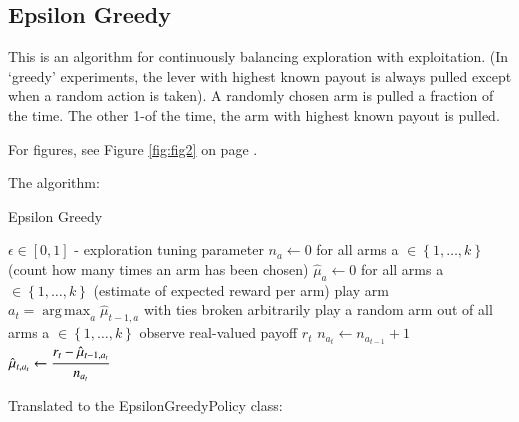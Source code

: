 \documentclass[nojss]{jss}\usepackage[]{graphicx}\usepackage[]{color}
\DeclareMathOperator*{\argmax}{arg\,max}
\begin{document}
\subsection{Epsilon Greedy}

This is an algorithm for continuously balancing exploration with exploitation. (In ‘greedy’ experiments, the lever with highest known payout is always pulled except when a random action is taken). A randomly chosen arm is pulled a fraction \epsilon of the time. The other 1-\epsilon of the time, the arm with highest known payout is pulled.

For figures, see Figure \ref{fig:fig2} on page \pageref{fig:fig2}.

The algorithm:

\begin{algorithm}
\caption{Epsilon Greedy}
\label{Alg:EpsilonGreedy}
\begin{algorithmic}
\REQUIRE \(    \epsilon  \in \left[ 0,1 \right] \) - exploration tuning parameter
\STATE \( n_{a} \leftarrow 0 \) for all arms a \(  \in \left\{ 1, \dots, k \right\} \)  (count how many times an arm has been chosen)
\STATE \( \hat{\mu}_{a} \leftarrow 0 \) for all arms a  \(   \in \left\{ 1, \dots, k \right\} \)  (estimate of expected reward per arm)
		\STATE play arm \(a_t = \argmax_a  \hat{\mu}_{t-1,a}  \) with ties broken arbitrarily
	\ELSE
		\STATE play a random arm out of all arms a \(  \in \left\{ 1, \dots, k \right\} \)
	\ENDIF
	\STATE observe real-valued payoff $r_t$
	\STATE \( n_{a_{t}} \leftarrow n_{a_{t-1}} + 1  \)
   \STATE \( \hat{\mu}_{t,a_{t}} \leftarrow   \cfrac{r_t - \hat{\mu}_{t-1,a_{t}} }{n_{a_{t}}}   \)
\ENDFOR
\end{algorithmic}
\end{algorithm}

Translated to the EpsilonGreedyPolicy class:
\end{document}
